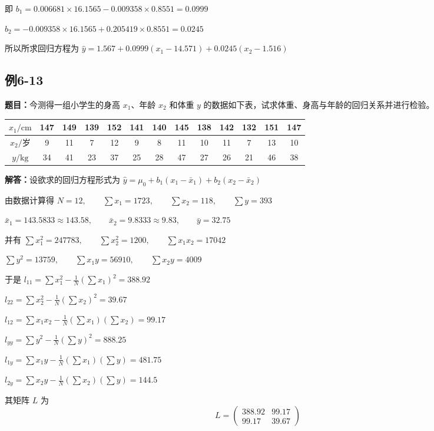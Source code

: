 \documentclass[UTF8,zihao=-4]{ctexart}
\newcommand{\problem}[1]{\subsection*{#1}}
\newcommand{\timu}{\noindent\textbf{题目：}}
\newcommand{\jieda}{\noindent\textbf{解答：}}
\begin{document}
即 $b_1=0.006681\times16.1565-0.009358\times0.8551=0.0999$

$b_2=-0.009358\times16.1565+0.205419\times0.8551=0.0245$

所以所求回归方程为 $\hat{y} = 1.567+0.0999(x_1-14.571)+0.0245(x_2-1.516)$

\problem{例6-13}

\timu 今测得一组小学生的身高 $x_1$、年龄 $x_2$ 和体重 $y$ 的数据如下表，试求体重、身高与年龄的回归关系并进行检验。

\begin{center}
\scriptsize
\setlength{\tabcolsep}{4pt}
\begin{tabular}{c|cccccccccccc}
\toprule
$x_1/\mathrm{cm}$ & 147 & 149 & 139 & 152 & 141 & 140 & 145 & 138 & 142 & 132 & 151 & 147\\
\midrule
$x_2/\text{岁}$ & 9 & 11 & 7 & 12 & 9 & 8 & 11 & 10 & 11 & 7 & 13 & 10\\
\midrule
$y/\mathrm{kg}$ & 34 & 41 & 23 & 37 & 25 & 28 & 47 & 27 & 26 & 21 & 46 & 38\\
\bottomrule
\end{tabular}
\end{center}

\jieda 设欲求的回归方程形式为 $\hat{y} = \mu_0+b_1(x_1-\bar{x}_1)+b_2(x_2-\bar{x}_2)$

由数据计算得 $N=12, \qquad \sum x_1=1723, \qquad \sum x_2=118, \qquad \sum y=393$

$\bar{x}_1=143.5833\approx143.58, \qquad \bar{x}_2=9.8333\approx9.83, \qquad \bar{y}=32.75$

并有 $\sum x_1^2=247783, \qquad \sum x_2^2=1200, \qquad \sum x_1x_2=17042$

$\sum y^2=13759, \qquad \sum x_1y=56910, \qquad \sum x_2y=4009$

于是 $l_{11} = \sum x_1^2-\frac{1}{N}\left(\sum x_1\right)^2 = 388.92$

$l_{22} = \sum x_2^2-\frac{1}{N}\left(\sum x_2\right)^2 = 39.67$

$l_{12} = \sum x_1x_2-\frac{1}{N}\left(\sum x_1\right)\left(\sum x_2\right) = 99.17$

$l_{yy} = \sum y^2-\frac{1}{N}\left(\sum y\right)^2 = 888.25$

$l_{1y} = \sum x_1y-\frac{1}{N}\left(\sum x_1\right)\left(\sum y\right) = 481.75$

$l_{2y} = \sum x_2y-\frac{1}{N}\left(\sum x_2\right)\left(\sum y\right) = 144.5$

其矩阵 $L$ 为
\begin{equation*}
L=
    \begin{pmatrix}
        388.92 & 99.17\\
        99.17 & 39.67
    \end{pmatrix}
\end{equation*}
\end{document}
